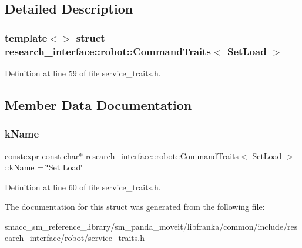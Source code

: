 \subsection{Detailed Description}
\subsubsection*{template$<$$>$\newline
struct research\+\_\+interface\+::robot\+::\+Command\+Traits$<$ Set\+Load $>$}



Definition at line 59 of file service\+\_\+traits.\+h.



\subsection{Member Data Documentation}
\mbox{\label{structresearch__interface_1_1robot_1_1CommandTraits_3_01SetLoad_01_4_a904c133ad4dcd761834be83b17da8184}} 
\subsubsection{\texorpdfstring{k\+Name}{kName}}
{\footnotesize\ttfamily constexpr const char$\ast$ \hyperlink{structresearch__interface_1_1robot_1_1CommandTraits}{research\+\_\+interface\+::robot\+::\+Command\+Traits}$<$ \hyperlink{structresearch__interface_1_1robot_1_1SetLoad}{Set\+Load} $>$\+::k\+Name = \char`\"{}Set Load\char`\"{}\hspace{0.3cm}{\ttfamily [static]}}



Definition at line 60 of file service\+\_\+traits.\+h.



The documentation for this struct was generated from the following file\+:\begin{DoxyCompactItemize}
\item 
smacc\+\_\+sm\+\_\+reference\+\_\+library/sm\+\_\+panda\+\_\+moveit/libfranka/common/include/research\+\_\+interface/robot/\hyperlink{service__traits_8h}{service\+\_\+traits.\+h}\end{DoxyCompactItemize}
